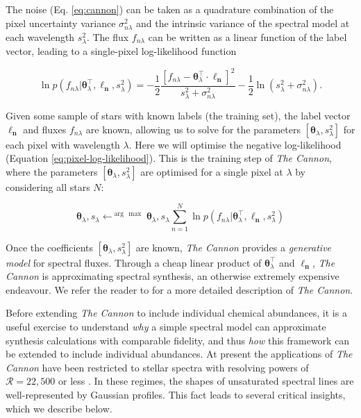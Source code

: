 \documentclass[useAMS,usenatbib]{mn2e}
\newcommand\tc{\textit{The Cannon}}
\newcommand\lv{\mathbf{\boldsymbol\ell_n}}
\newcommand\cv{{\boldsymbol\theta}_\lambda}
\newcommand\ssq{s_\lambda^2}
\newcommand\given{|}
\begin{document}
The noise (Eq. \ref{eq:cannon}) can be taken as a quadrature combination of the pixel uncertainty variance $\sigma_{n\lambda}^2$ and the intrinsic variance of the spectral model at each wavelength $s_\lambda^2$. The flux $f_{n\lambda}$ can be written as a linear function of the label vector, leading to a single-pixel log-likelihood function

\begin{equation}
\ln{p}\left(f_{n\lambda}\given\cv^\intercal,\lv, s_{\lambda}^2\right) = -\frac{1}{2}\frac{\left[f_{n\lambda} - \cv^{\intercal}\cdot\lv\right]^2}{s_\lambda^2 + \sigma_{n\lambda}^2} -\frac{1}{2}\ln\left(s_{\lambda}^2 + \sigma_{n\lambda}^2\right).
\label{eq:pixel-log-likelihood}
\end{equation}

Given some sample of stars with known labels (the training set), the label vector $\lv$ and fluxes $f_{n\lambda}$ are known, allowing us to solve for the parameters $[\cv,s_\lambda^2]$ for each pixel with wavelength $\lambda$. Here we will optimise the negative log-likelihood (Equation \ref{eq:pixel-log-likelihood}). This is the training step of \tc{}, where the parameters $[\cv,s_\lambda^2]$ are optimised for a single pixel at $\lambda$ by considering all stars $N$:

\begin{equation}
\cv,s_\lambda \leftarrow^{\arg\,\max} {\cv, s_\lambda} \sum_{n=1}^N \ln{p}\left(f_{n\lambda}\given\cv^\intercal,\lv,s_\lambda^2\right)
\end{equation}

Once the coefficients $[\cv,\ssq]$ are known, \tc{} provides a \textit{generative model} for spectral fluxes. Through a cheap linear product of $\cv^\intercal$ and $\lv$, \tc{} is approximating spectral synthesis, an otherwise extremely expensive endeavour. We refer the reader to \citet{Ness15a} for a more detailed description of \tc{}. 

Before extending \tc{} to include individual chemical abundances, it is
a useful exercise to understand \textit{why} a simple spectral model can 
approximate synthesis calculations with comparable fidelity, and thus \textit{how} this framework can be extended to include individual abundances. At present the applications of \tc{} have been restricted to stellar spectra with resolving powers of $\mathcal{R} = 22,500$ \citep[APOGEE;][]{Ness15a} or less \citep[e.g., LAMOST;][]{Ho15}. In these regimes, the shapes of unsaturated spectral lines are well-represented by Gaussian profiles. This fact leads to several critical insights, which we describe below.
\end{document}
